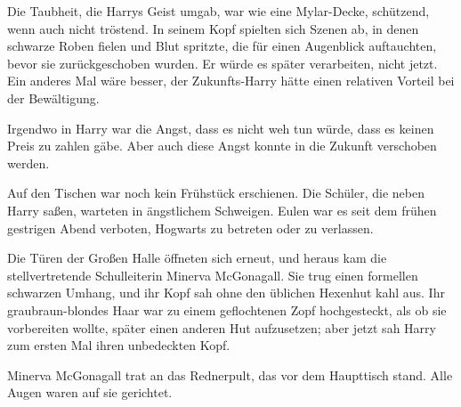 Die Taubheit, die Harrys Geist umgab, war wie eine Mylar-Decke, schützend, wenn auch nicht tröstend. In seinem Kopf spielten sich Szenen ab, in denen schwarze Roben fielen und Blut spritzte, die für einen Augenblick auftauchten, bevor sie zurückgeschoben wurden. Er würde es später verarbeiten, nicht jetzt. Ein anderes Mal wäre besser, der Zukunfts-Harry hätte einen relativen Vorteil bei der Bewältigung.

Irgendwo in Harry war die Angst, dass es nicht weh tun würde, dass es keinen Preis zu zahlen gäbe. Aber auch diese Angst konnte in die Zukunft verschoben werden.

Auf den Tischen war noch kein Frühstück erschienen. Die Schüler, die neben Harry saßen, warteten in ängstlichem Schweigen. Eulen war es seit dem frühen gestrigen Abend verboten, Hogwarts zu betreten oder zu verlassen.

Die Türen der Großen Halle öffneten sich erneut, und heraus kam die stellvertretende Schulleiterin Minerva McGonagall. Sie trug einen formellen schwarzen Umhang, und ihr Kopf sah ohne den üblichen Hexenhut kahl aus. Ihr graubraun-blondes Haar war zu einem geflochtenen Zopf hochgesteckt, als ob sie vorbereiten wollte, später einen anderen Hut aufzusetzen; aber jetzt sah Harry zum ersten Mal ihren unbedeckten Kopf.

Minerva McGonagall trat an das Rednerpult, das vor dem Haupttisch stand. Alle Augen waren auf sie gerichtet.

